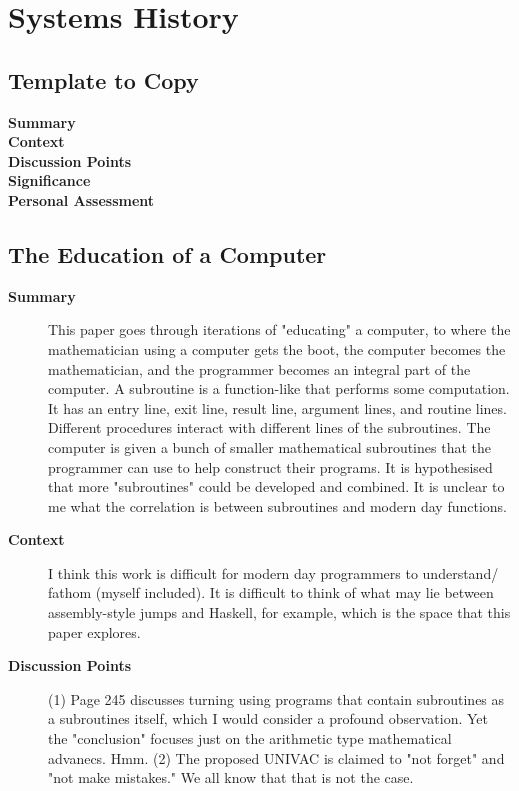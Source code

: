 \chapter {Systems History}

\section {Template to Copy}

\begin{description}
    \item[\textbf{Summary}]
    \item[\textbf{Context}]
    \item[\textbf{Discussion Points}]
    \item[\textbf{Significance}]
    \item[\textbf{Personal Assessment}]
\end{description}

\section {The Education of a Computer \cite{hopper1952education}}

\begin{description}
    \item[\textbf{Summary}] This paper goes through iterations of "educating" a computer, to where the mathematician using a computer gets the boot, the computer becomes the mathematician, and the programmer becomes an integral part of the computer.
        A subroutine is a function-like that performs some computation. It has an entry line, exit line, result line, argument lines, and routine lines.
        Different procedures interact with different lines of the subroutines.
        The computer is given a bunch of smaller mathematical subroutines that the programmer can use to help construct their programs.
        It is hypothesised that more "subroutines" could be developed and combined.
        It is unclear to me what the correlation is between subroutines and modern day functions.
    \item[\textbf{Context}] I think this work is difficult for modern day programmers to understand/ fathom (myself included).
        It is difficult to think of what may lie between assembly-style jumps and Haskell, for example, which is the space that this paper explores.
    \item[\textbf{Discussion Points}] (1) Page 245 discusses turning using programs that contain subroutines as a subroutines itself, which I would consider a profound observation.
        Yet the "conclusion" focuses just on the arithmetic type mathematical advanecs. Hmm.
        (2) The proposed UNIVAC is claimed to "not forget" and "not make mistakes."
        We all know that that is not the case.
\end{description}

